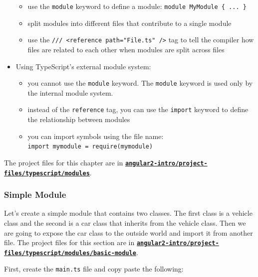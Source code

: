 \documentclass[12pt,]{article}
\providecommand{\tightlist}{%
  \setlength{\itemsep}{0pt}\setlength{\parskip}{0pt}}
\begin{document}
\begin{itemize}
  \begin{itemize}
  \tightlist
  \item
    use the \texttt{module} keyword to define a module:
    \texttt{module\ MyModule\ \{\ ...\ \}}
  \item
    split modules into different files that contribute to a single
    module
  \item
    use the
    \texttt{///\ \textless{}reference\ path="File.ts"\ /\textgreater{}}
    tag to tell the compiler how files are related to each other when
    modules are split across files
  \end{itemize}
\item
  Using TypeScript's external module system:

  \begin{itemize}
  \tightlist
  \item
    you cannot use the \texttt{module} keyword. The \texttt{module}
    keyword is used only by the internal module system.
  \item
    instead of the \texttt{reference} tag, you can use the
    \texttt{import} keyword to define the relationship between modules
  \item
    you can import symbols using the file name:
    \texttt{import\ mymodule\ =\ require(\textquotesingle{}mymodule\textquotesingle{})}
  \end{itemize}
\end{itemize}

The project files for this chapter are in
\href{https://github.com/aminmeyghani/angular2-intro/tree/master/project-files/typescript/modules}{\textbf{\texttt{angular2-intro/project-files/typescript/modules}}}.

\subsubsection{Simple Module}\label{simple-module}

Let's create a simple module that contains two classes. The first class
is a vehicle class and the second is a car class that inherits from the
vehicle class. Then we are going to expose the car class to the outside
world and import it from another file. The project files for this
section are in
\href{https://github.com/aminmeyghani/angular2-intro/tree/master/project-files/typescript/modules/basic-module}{\textbf{\texttt{angular2-intro/project-files/typescript/modules/basic-module}}}.

First, create the \texttt{main.ts} file and copy paste the following:
\end{document}
